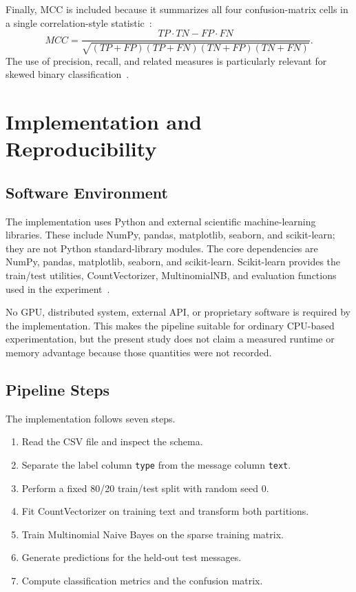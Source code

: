 \documentclass[conference]{IEEEtran}
\begin{document}
Finally, MCC is included because it summarizes all four confusion-matrix cells in a single correlation-style statistic~\cite{chicco2020mcc}:
\begin{equation}
MCC=\frac{TP\cdot TN-FP\cdot FN}{\sqrt{(TP+FP)(TP+FN)(TN+FP)(TN+FN)}}.
\end{equation}
The use of precision, recall, and related measures is particularly relevant for skewed binary classification~\cite{davis2006pr,saito2015pr}.

\section{Implementation and Reproducibility}
\subsection{Software Environment}
The implementation uses Python and external scientific machine-learning libraries. These include NumPy, pandas, matplotlib, seaborn, and scikit-learn; they are not Python standard-library modules. The core dependencies are NumPy, pandas, matplotlib, seaborn, and scikit-learn. Scikit-learn provides the train/test utilities, CountVectorizer, MultinomialNB, and evaluation functions used in the experiment~\cite{pedregosa2011sklearn}.

No GPU, distributed system, external API, or proprietary software is required by the implementation. This makes the pipeline suitable for ordinary CPU-based experimentation, but the present study does not claim a measured runtime or memory advantage because those quantities were not recorded.

\subsection{Pipeline Steps}
The implementation follows seven steps.
\begin{enumerate}
\item Read the CSV file and inspect the schema.
\item Separate the label column \texttt{type} from the message column \texttt{text}.
\item Perform a fixed 80/20 train/test split with random seed 0.
\item Fit CountVectorizer on training text and transform both partitions.
\item Train Multinomial Naive Bayes on the sparse training matrix.
\item Generate predictions for the held-out test messages.
\item Compute classification metrics and the confusion matrix.
\end{enumerate}
\end{document}
